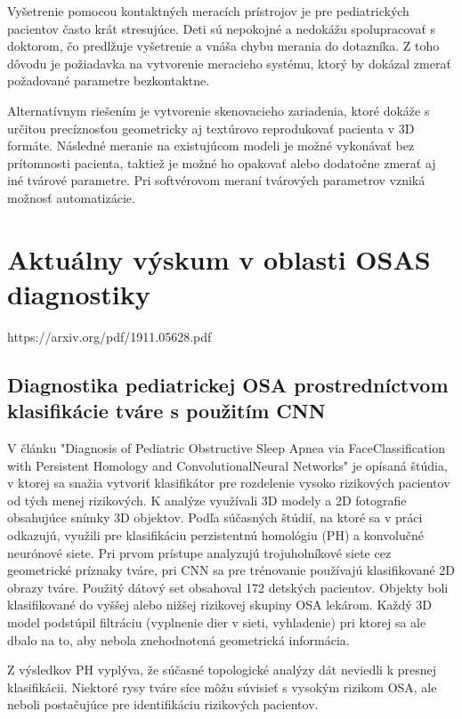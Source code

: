 Vyšetrenie pomocou kontaktných meracích prístrojov je pre pediatrických pacientov často krát
stresujúce. Deti sú nepokojné a nedokážu spolupracovať s doktorom, čo predlžuje vyšetrenie a
vnáša chybu merania do dotazníka. Z toho dôvodu je požiadavka na vytvorenie meracieho
systému, ktorý by dokázal zmerať požadované parametre bezkontaktne.

Alternatívnym riešením je vytvorenie skenovacieho zariadenia, ktoré dokáže s určitou
precíznosťou geometricky aj textúrovo reprodukovať pacienta v 3D formáte. Následné meranie
na existujúcom modeli je možné vykonávať bez prítomnosti pacienta, taktiež je možné ho
opakovať alebo dodatočne zmerať aj iné tvárové parametre. Pri softvérovom meraní tvárových
parametrov vzniká možnosť automatizácie.

\section{Aktuálny výskum v oblasti OSAS diagnostiky}

https://arxiv.org/pdf/1911.05628.pdf
\newpage
\subsection{Diagnostika pediatrickej OSA prostredníctvom klasifikácie tváre s použitím CNN}

V článku "Diagnosis of Pediatric Obstructive Sleep Apnea via FaceClassification with Persistent Homology and ConvolutionalNeural Networks" je opísaná štúdia, v ktorej sa snažia vytvoriť klasifikátor pre rozdelenie vysoko rizikových pacientov od tých menej rizikových. K analýze využívali 3D modely a 2D fotografie obsahujúce snímky 3D objektov. Podľa súčasných štúdií, na ktoré sa v práci odkazujú, využili pre klasifikáciu perzistentnú homológiu (PH) a konvolučné neurónové siete. Pri prvom prístupe analyzujú trojuholníkové siete cez geometrické príznaky tváre, pri CNN sa pre trénovanie používajú klasifikované 2D obrazy tváre. Použitý dátový set obsahoval 172 detských pacientov. Objekty boli  klasifikované do vyššej alebo nižšej rizikovej skupiny OSA lekárom. Každý 3D model podstúpil filtráciu (vyplnenie dier v sieti, vyhladenie) pri ktorej sa ale dbalo na to, aby nebola znehodnotená geometrická informácia. 

Z výsledkov PH vyplýva, že súčasné topologické analýzy dát neviedli k presnej klasifikácii. Niektoré rysy tváre síce môžu súvisieť s vysokým rizikom OSA, ale neboli postačujúce pre identifikáciu rizikových pacientov. 


